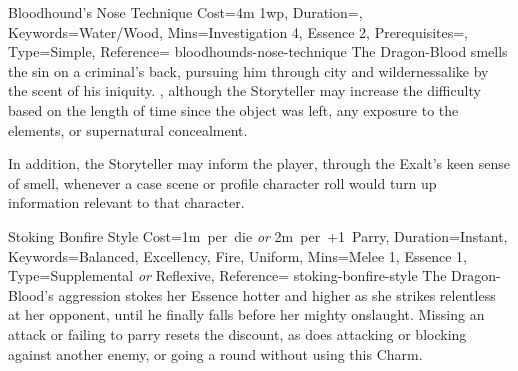 \begin{Charm}{Bloodhound's Nose Technique}{%
    Cost=4m 1wp,
    Duration={},
    Keywords=Water/Wood,
    Mins={Investigation 4, Essence 2},
    Prerequisites=,
    Type=Simple,
    Reference=\cite*[p.~199]{db}
}{bloodhounds-nose-technique}
    The Dragon-Blood smells the sin on a criminal's back, pursuing him through city
    and wildernessalike by the scent of his iniquity. , although the Storyteller may increase the difficulty based on
    the length of time since the object was left, any exposure to the elements, or
    supernatural concealment. 

     In addition, the Storyteller may inform the player,
    through the Exalt's keen sense of smell, whenever a case scene or profile
    character roll would turn up information relevant to that character.
\end{Charm}



\DocumentColumnBreak
{}

\begin{Charm}{Stoking Bonfire Style}{%
    Cost={1m~per~die \emph{or} 2m~per~+1~Parry},
    Duration=Instant,
    Keywords={Balanced, Excellency, Fire, Uniform},
    Mins={Melee 1, Essence 1},
    Type={Supplemental{} \emph{or} Reflexive},
    Reference=\cite*[p.~225]{db}
}{stoking-bonfire-style}
    The Dragon-Blood's aggression stokes her Essence hotter and higher as she
    strikes relentless at her opponent, until he finally falls before her mighty
    onslaught.  Missing an
    attack or failing to parry resets the discount, as does attacking or blocking
    against another enemy, or going a round without using this Charm.
\end{Charm}


